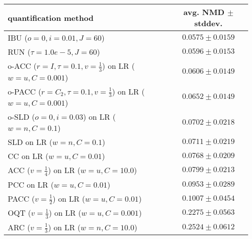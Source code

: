 \begin{tabular}{lc}
  \toprule
  quantification method & avg. NMD $\pm$ stddev. \\
  \midrule
  IBU ($o=0, i=0.01, J=60$) & $\mathbf{0.0575 \pm 0.0159}$ \\
  RUN ($\tau=1.0e-5, J=60$) & $0.0596 \pm 0.0153$ \\
  o-ACC ($r=I, \tau=0.1, v=\frac{1}{3}$) on LR ($w=u, C=0.001$) & $0.0606 \pm 0.0149$ \\
  o-PACC ($r=C_2, \tau=0.1, v=\frac{1}{3}$) on LR ($w=u, C=0.001$) & $0.0652 \pm 0.0149$ \\
  o-SLD ($o=0, i=0.03$) on LR ($w=n, C=0.1$) & $0.0702 \pm 0.0218$ \\
  SLD on LR ($w=n, C=0.1$) & $0.0711 \pm 0.0219$ \\
  CC on LR ($w=u, C=0.01$) & $0.0768 \pm 0.0209$ \\
  ACC ($v=\frac{1}{4}$) on LR ($w=u, C=10.0$) & $0.0799 \pm 0.0213$ \\
  PCC on LR ($w=u, C=0.01$) & $0.0953 \pm 0.0289$ \\
  PACC ($v=\frac{1}{2}$) on LR ($w=u, C=0.01$) & $0.1007 \pm 0.0454$ \\
  OQT ($v=\frac{1}{3}$) on LR ($w=u, C=0.001$) & $0.2275 \pm 0.0563$ \\
  ARC ($v=\frac{1}{3}$) on LR ($w=n, C=10.0$) & $0.2524 \pm 0.0612$ \\
  \bottomrule
\end{tabular}
